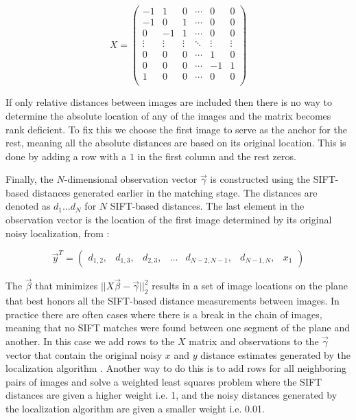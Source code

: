 \documentclass[10pt,twocolumn,letterpaper]{article}
\begin{document}
\[
X =
\begin{pmatrix}
  -1 & 1 & 0 & \cdots & 0 & 0\\
  -1 & 0 & 1 & \cdots & 0 & 0\\
  0 & -1 & 1 & \cdots & 0 & 0\\
  \vdots  & \vdots & \vdots & \ddots & \vdots  & \vdots\\
  0 & 0 & 0 & \cdots & 1 & 0 \\
  0 & 0 & 0 & \cdots & -1 & 1 \\
  1 & 0 & 0 & \cdots & 0 & 0 \\
\end{pmatrix}
\]

If only relative distances between images are included then there is
no way to determine the absolute location of any of the images and the
matrix becomes rank deficient. To fix this we choose the first image
to serve as the anchor for the rest, meaning all the absolute
distances are based on its original location. This is done by adding a
row with a $1$ in the first column and the rest zeros.

Finally, the $N$-dimensional observation vector $\vec{\gamma}$ is constructed using the
SIFT-based distances generated earlier in the matching stage. The
distances are denoted as $d_1 \dots d_N$ for $N$ SIFT-based
distances. The last element in the observation vector is the location
of the first image determined by its original noisy localization, from \cite{chen2010indoor, liu2010indoor}:

\[
\vec{y}^T =
\begin{pmatrix}
  d_{1,2}, &d_{1,3}, &d_{2,3}, &\hdots &d_{N-2,N-1}, &d_{N-1,N}, &x_1
\end{pmatrix}
\]

The $\vec{\beta}$ that minimizes $||X \vec{\beta} - \vec{\gamma}||_2^2$ results in a set of
image locations on the plane that best honors all the SIFT-based
distance measurements between images. In practice there are often
cases where there is a break in the chain of images, meaning that no
SIFT matches were found between one segment of the plane and
another. In this case we add rows to the $X$ matrix and observations
to the $\vec{\gamma}$ vector that contain the original noisy $x$ and $y$ distance
estimates generated by the localization algorithm \cite{chen2010indoor, liu2010indoor}. Another way to do
this is to add rows for all neighboring pairs of images and solve a
weighted least squares problem where the SIFT distances are given a
higher weight i.e. 1, and the noisy distances generated by the localization
algorithm \cite{chen2010indoor, liu2010indoor} are given a smaller weight i.e. 0.01.
\end{document}
